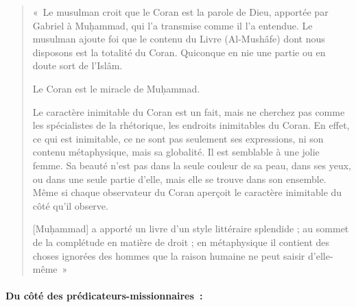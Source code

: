   


\begin{quote}
    

«~Le musulman croit que le Coran est la parole de Dieu, apportée par
Gabriel à Muḥammad, qui l'a transmise comme il l'a entendue. Le musulman
ajoute foi que le contenu du Livre (Al-Mushâfe) dont nous disposons est
la totalité du Coran. Quiconque en nie une partie ou en doute sort de
l'Islâm.

Le Coran est le miracle de Muḥammad.

Le caractère inimitable du Coran est un fait, mais ne cherchez pas comme
les spécialistes de la rhétorique, les endroits inimitables du Coran. En
effet, ce qui est inimitable, ce ne sont pas seulement ses expressions,
ni son contenu métaphysique, mais sa globalité. Il est semblable à une
jolie femme. Sa beauté n'est pas dans la seule couleur de sa peau, dans
ses yeux, ou dans une seule partie d'elle, mais elle se trouve dans son
ensemble. Même si chaque observateur du Coran aperçoit le caractère
inimitable du côté qu'il observe.
 
{[}Muḥammad{]} a apporté un livre d'un style littéraire splendide ; au
sommet de la complétude en matière de droit ; en métaphysique il
contient des choses ignorées des hommes que la raison humaine ne peut
saisir d'elle-même~»
\end{quote}



\paragraph{Du côté des prédicateurs-missionnaires~:
}

